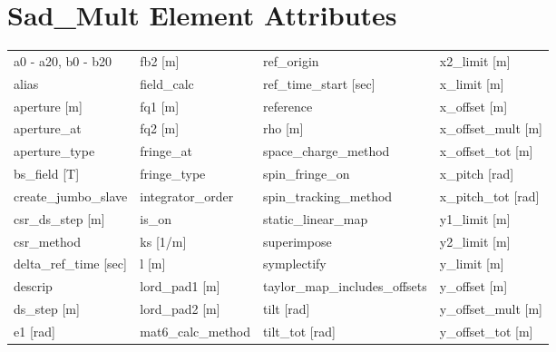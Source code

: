  \section{Sad_Mult Element Attributes}
 \label{s:list.sad.mult}
 
 \begin{tabular}{llll} \toprule
a0 - a20, b0 - b20               & fb2 [m]                          & ref_origin                       & x2_limit [m]                     \\
alias                            & field_calc                       & ref_time_start [sec]             & x_limit [m]                      \\
aperture [m]                     & fq1 [m]                          & reference                        & x_offset [m]                     \\
aperture_at                      & fq2 [m]                          & rho [m]                          & x_offset_mult [m]                \\
aperture_type                    & fringe_at                        & space_charge_method              & x_offset_tot [m]                 \\
bs_field [T]                     & fringe_type                      & spin_fringe_on                   & x_pitch [rad]                    \\
create_jumbo_slave               & integrator_order                 & spin_tracking_method             & x_pitch_tot [rad]                \\
csr_ds_step [m]                  & is_on                            & static_linear_map                & y1_limit [m]                     \\
csr_method                       & ks [1/m]                         & superimpose                      & y2_limit [m]                     \\
delta_ref_time [sec]             & l [m]                            & symplectify                      & y_limit [m]                      \\
descrip                          & lord_pad1 [m]                    & taylor_map_includes_offsets      & y_offset [m]                     \\
ds_step [m]                      & lord_pad2 [m]                    & tilt [rad]                       & y_offset_mult [m]                \\
e1 [rad]                         & mat6_calc_method                 & tilt_tot [rad]                   & y_offset_tot [m]                 \\

\end{tabular}
